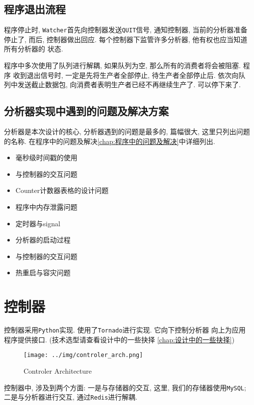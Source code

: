 \subsection{程序退出流程}

程序停止时, \texttt{Watcher}首先向控制器发送\texttt{QUIT}信号,
通知控制器, 当前的分析器准备 停止了, 而后, 控制器做出回应.
每个控制器下监管许多分析器, 他有权也应当知道所有分析器的 状态.

程序中多次使用了队列进行解耦, 如果队列为空, 那么所有的消费者将会被阻塞.
程序 收到退出信号时, 一定是先将生产者全部停止, 待生产者全部停止后.
依次向队列中发送截止数据包, 向消费者表明生产者已经不再继续生产了.
可以停下来了.

\subsection{分析器实现中遇到的问题及解决方案}

分析器是本次设计的核心, 分析器遇到的问题是最多的, 篇幅很大,
这里只列出问题的名称. 在程序中的问题及解决\ref{chap:程序中的问题及解决}中详细列出.

\begin{itemize}
  \item 毫秒级时间戳的使用
  \item 与控制器的交互问题
  \item Counter计数器表格的设计问题
  \item 程序中内存泄露问题
  \item 定时器与signal
  \item 分析器的启动过程
  \item 与控制器的交互问题
  \item 热重启与容灾问题
\end{itemize}
\section{控制器}

控制器采用\texttt{Python}实现. 使用了\texttt{Tornado}进行实现. 它向下控制分析器
向上为应用程序提供接口. (技术选型请查看设计中的一些抉择
\ref{chap:设计中的一些抉择})


\begin{figure}[htbp!]
  \centering
  \texttt{[image: ../img/controler\_arch.png]}
  \caption{Controler Architecture}
  \label{fig:contoler_arch}
\end{figure}

控制器中, 涉及到两个方面:
一是与存储器的交互, 这里, 我们的存储器使用\texttt{MySQL};
二是与分析器进行交互, 通过\texttt{Redis}进行解耦.


